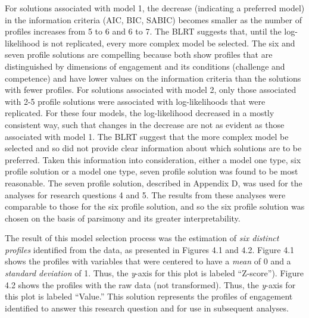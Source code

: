 \documentclass[]{msu-thesis}
\theoremstyle{definition}
\theoremstyle{definition}
\theoremstyle{definition}
\theoremstyle{remark}
\begin{document}
For solutions associated with model 1, the decrease (indicating a
preferred model) in the information criteria (AIC, BIC, SABIC) becomes
smaller as the number of profiles increases from 5 to 6 and 6 to 7. The
BLRT suggests that, until the log-likelihood is not replicated, every
more complex model be selected. The six and seven profile solutions are
compelling because both show profiles that are distinguished by
dimensions of engagement and its conditions (challenge and competence)
and have lower values on the information criteria than the solutions
with fewer profiles. For solutions associated with model 2, only those
associated with 2-5 profile solutions were associated with
log-likelihoods that were replicated. For these four models, the
log-likelihood decreased in a mostly consistent way, such that changes
in the decrease are not as evident as those associated with model 1. The
BLRT suggest that the more complex model be selected and so did not
provide clear information about which solutions are to be preferred.
Taken this information into consideration, either a model one type, six
profile solution or a model one type, seven profile solution was found
to be most reasonable. The seven profile solution, described in Appendix
D, was used for the analyses for research questions 4 and 5. The results
from these analyses were comparable to those for the six profile
solution, and so the six profile solution was chosen on the basis of
parsimony and its greater interpretability.

The result of this model selection process was the estimation of
\emph{six distinct profiles} identified from the data, as presented in
Figures 4.1 and 4.2. Figure 4.1 shows the profiles with variables that
were centered to have a \emph{mean} of 0 and a \emph{standard deviation}
of 1. Thus, the \emph{y}-axis for this plot is labeled ``Z-score'').
Figure 4.2 shows the profiles with the raw data (not transformed). Thus,
the \emph{y}-axis for this plot is labeled ``Value.'' This solution
represents the profiles of engagement identified to answer this research
question and for use in subsequent analyses.
\end{document}
